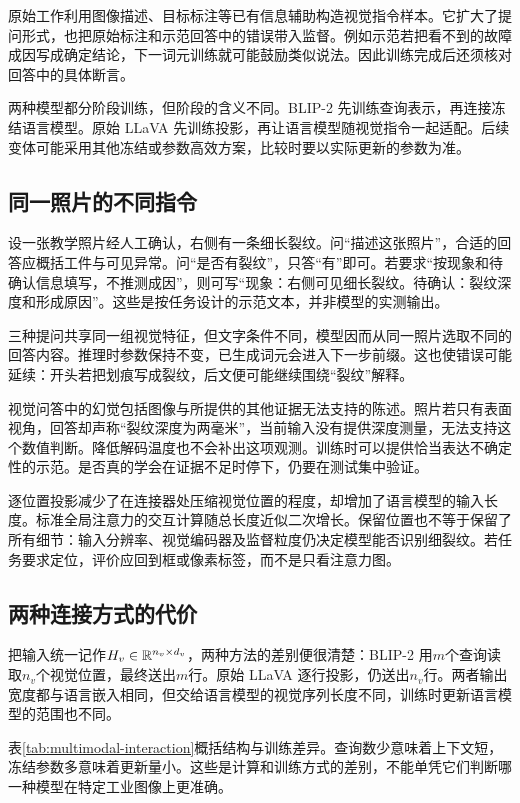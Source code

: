 原始工作利用图像描述、目标标注等已有信息辅助构造视觉指令样本。它扩大了提问形式，也把原始标注和示范回答中的错误带入监督。例如示范若把看不到的故障成因写成确定结论，下一词元训练就可能鼓励类似说法。因此训练完成后还须核对回答中的具体断言。

两种模型都分阶段训练，但阶段的含义不同。BLIP-2 先训练查询表示，再连接冻结语言模型。原始 LLaVA 先训练投影，再让语言模型随视觉指令一起适配。后续变体可能采用其他冻结或参数高效方案，比较时要以实际更新的参数为准。

\subsection{同一照片的不同指令}
设一张教学照片经人工确认，右侧有一条细长裂纹。问“描述这张照片”，合适的回答应概括工件与可见异常。问“是否有裂纹”，只答“有”即可。若要求“按现象和待确认信息填写，不推测成因”，则可写“现象：右侧可见细长裂纹。待确认：裂纹深度和形成原因”。这些是按任务设计的示范文本，并非模型的实测输出。

三种提问共享同一组视觉特征，但文字条件不同，模型因而从同一照片选取不同的回答内容。推理时参数保持不变，已生成词元会进入下一步前缀。这也使错误可能延续：开头若把划痕写成裂纹，后文便可能继续围绕“裂纹”解释。

视觉问答中的幻觉包括图像与所提供的其他证据无法支持的陈述。照片若只有表面视角，回答却声称“裂纹深度为两毫米”，当前输入没有提供深度测量，无法支持这个数值判断。降低解码温度也不会补出这项观测。训练时可以提供恰当表达不确定性的示范。是否真的学会在证据不足时停下，仍要在测试集中验证。

逐位置投影减少了在连接器处压缩视觉位置的程度，却增加了语言模型的输入长度。标准全局注意力的交互计算随总长度近似二次增长。保留位置也不等于保留了所有细节：输入分辨率、视觉编码器及监督粒度仍决定模型能否识别细裂纹。若任务要求定位，评价应回到框或像素标签，而不是只看注意力图。

\subsection{两种连接方式的代价}
把输入统一记作$H_v\in\mathbb{R}^{n_v\times d_v}$，两种方法的差别便很清楚：BLIP-2 用$m$个查询读取$n_v$个视觉位置，最终送出$m$行。原始 LLaVA 逐行投影，仍送出$n_v$行。两者输出宽度都与语言嵌入相同，但交给语言模型的视觉序列长度不同，训练时更新语言模型的范围也不同。

表\ref{tab:multimodal-interaction}概括结构与训练差异。查询数少意味着上下文短，冻结参数多意味着更新量小。这些是计算和训练方式的差别，不能单凭它们判断哪一种模型在特定工业图像上更准确。


